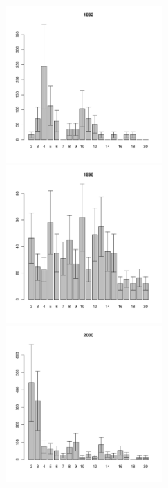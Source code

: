 	\begin{figure}[hp]

	\begin{minipage}[b]{.3\linewidth}
	\begin{center}
	\includegraphics[width=60mm]{../White_Sea/Luvenga_II_razrez/low_beatch2_1992_.pdf}	
	\end{center}
	\end{minipage}
	\hfil %
	\begin{minipage}[b]{.3\linewidth}
	\begin{center}
	\includegraphics[width=60mm]{../White_Sea/Luvenga_II_razrez/low_beatch2_1996_.pdf}
	\end{center}
	\end{minipage}
	\hfil %
	\begin{minipage}[b]{.3\linewidth}
	\begin{center}
\includegraphics[width=60mm]{../White_Sea/Luvenga_II_razrez/low_beatch2_2000_.pdf}

\end{center}
\end{minipage}
\end{figure}
